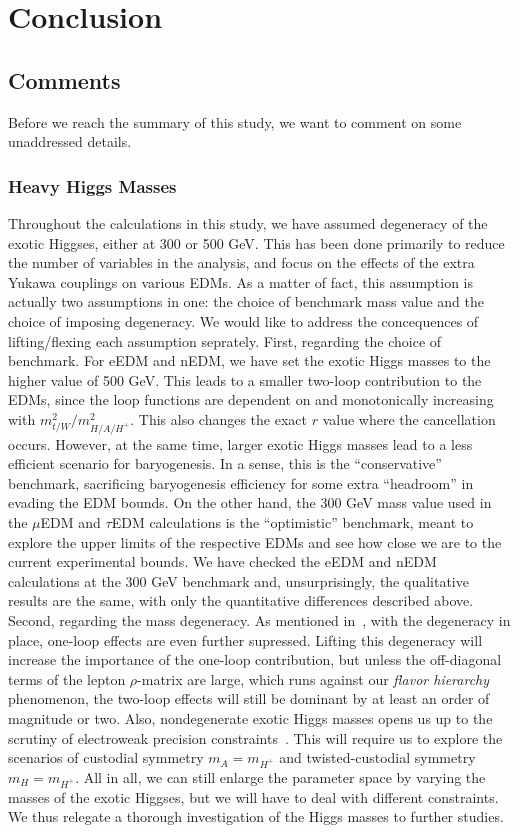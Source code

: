 \chapter{Conclusion}
\label{ch:conclusion}
\section{Comments}
Before we reach the summary of this study, we want to comment on some unaddressed details.

\subsection{Heavy Higgs Masses}
Throughout the calculations in this study, we have assumed degeneracy of the exotic Higgses, either at 300 or 500 GeV.
This has been done primarily to reduce the number of variables in the analysis, and focus on the effects of the extra Yukawa couplings on various EDMs.
As a matter of fact, this assumption is actually two assumptions in one: the choice of benchmark mass value and the choice of imposing degeneracy.
We would like to address the concequences of lifting/flexing each assumption seprately.
First, regarding the choice of benchmark.
For eEDM and nEDM, we have set the exotic Higgs masses to the higher value of 500 GeV.
This leads to a smaller two-loop contribution to the EDMs, since the loop functions are dependent on and monotonically increasing with \(m_{t/W}^{2}/m_{H/A/H^{+}}^{2} \).
This also changes the exact \(r \) value where the cancellation occurs.
However, at the same time, larger exotic Higgs masses lead to a less efficient scenario for baryogenesis.
In a sense, this is the ``conservative'' benchmark, sacrificing baryogenesis efficiency for some extra ``headroom'' in evading the EDM bounds.
On the other hand, the 300 GeV mass value used in the \(\mu \)EDM and \(\tau \)EDM calculations is the ``optimistic'' benchmark,
meant to explore the upper limits of the respective EDMs and see how close we are to the current experimental bounds.
We have checked the eEDM and nEDM calculations at the 300 GeV benchmark and, unsurprisingly, the qualitative results are the same, with only the quantitative differences described above.
Second, regarding the mass degeneracy.
As mentioned in~, with the degeneracy in place, one-loop effects are even further supressed.
Lifting this degeneracy will increase the importance of the one-loop contribution, but unless the off-diagonal terms of the lepton \(\rho \)-matrix are large,
which runs against our \textit{flavor hierarchy} phenomenon, 
the two-loop effects will still be dominant by at least an order of magnitude or two.
Also, nondegenerate exotic Higgs masses opens us up to the scrutiny of electroweak precision constraints~\cite{PDG2022}.
This will require us to explore the scenarios of custodial symmetry \(m_{A} = m_{H^{+}} \) and twisted-custodial symmetry~\cite{Gerard2007TwistedCustodial} \(m_{H} = m_{H^{+}} \).
All in all, we can still enlarge the parameter space by varying the masses of the exotic Higgses, but we will have to deal with different constraints.
We thus relegate a thorough investigation of the Higgs masses to further studies.

